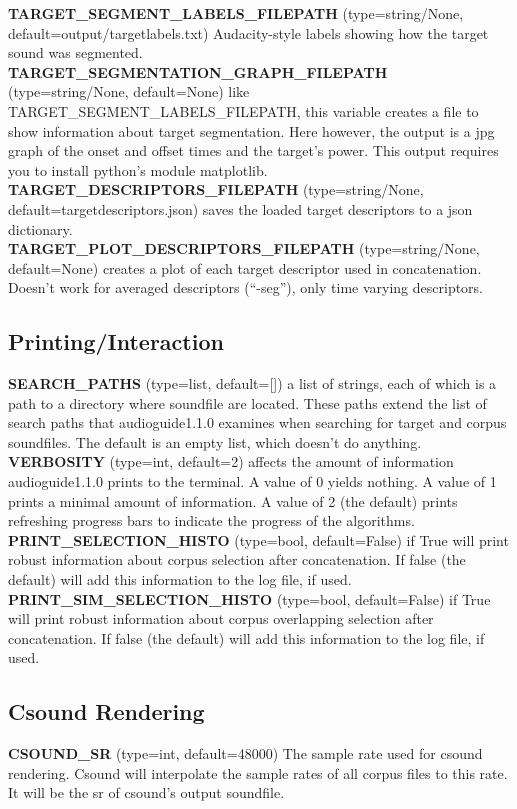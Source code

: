 \documentclass{article}
\newcommand{\optEntry}[4]{\textbf{#1} (type=#2, default=#3) #4\hspace{0.5em}\\}
\newcommand{\ag}{audioguide1.1.0\xspace}
\begin{document}
\begin{spacing}{1.2}
\optEntry{TARGET\_SEGMENT\_LABELS\_FILEPATH}{string/None}{output/targetlabels.txt}{Audacity-style labels showing how the target sound was segmented.}

\optEntry{TARGET\_SEGMENTATION\_GRAPH\_FILEPATH}{string/None}{None}{like TARGET\_SEGMENT\_LABELS\_FILEPATH, this variable creates a file to show information about target segmentation.  Here however, the output is a jpg graph of the onset and offset times and the target's power.  This output requires you to install python's module matplotlib.}

\optEntry{TARGET\_DESCRIPTORS\_FILEPATH}{string/None}{targetdescriptors.json}{saves the loaded target descriptors to a json dictionary.}

\optEntry{TARGET\_PLOT\_DESCRIPTORS\_FILEPATH}{string/None}{None}{creates a plot of each target descriptor used in concatenation.  Doesn't work for averaged descriptors (``-seg''), only time varying descriptors.}



\subsection{Printing/Interaction}
\optEntry{SEARCH\_PATHS}{list}{[]}{a list of strings, each of which is a path to a directory where soundfile are located.  These paths extend the list of search paths that \ag examines when searching for target and corpus soundfiles.  The default is an empty list, which doesn't do anything.}

\optEntry{VERBOSITY}{int}{2}{affects the amount of information \ag prints to the terminal.  A value of 0 yields nothing.  A value of 1 prints a minimal amount of information.  A value of 2 (the default) prints refreshing progress bars to indicate the progress of the algorithms.}

\optEntry{PRINT\_SELECTION\_HISTO}{bool}{False}{if True will print robust information about corpus selection after concatenation.  If false (the default) will add this information to the log file, if used.}

\optEntry{PRINT\_SIM\_SELECTION\_HISTO}{bool}{False}{if True will print robust information about corpus overlapping selection after concatenation.  If false (the default) will add this information to the log file, if used.}


\subsection{Csound Rendering}
\optEntry{CSOUND\_SR}{int}{48000}{The sample rate used for csound rendering.  Csound will interpolate the sample rates of all corpus files to this rate.  It will be the sr of csound's output soundfile.}


\end{spacing}
\end{document}
